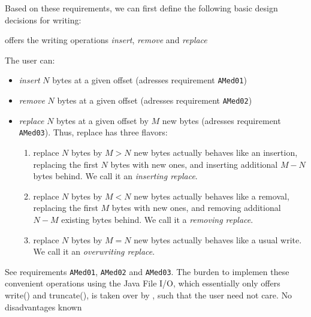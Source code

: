 Based on these requirements, we can first define the following basic design decisions for writing:

{%
\COMPmedia{} offers the writing operations \emph{insert}, \emph{remove} and \emph{replace}
}
{%
The user can:
\begin{itemize}
\item \emph{insert} $N$ bytes at a given offset (adresses requirement \texttt{AMed01})
\item \emph{remove} $N$ bytes at a given offset (adresses requirement \texttt{AMed02})
\item \emph{replace} $N$ bytes at a given offset by $M$ new bytes (adresses requirement \texttt{AMed03}). Thus, replace has three flavors:
\begin{enumerate}
\item replace $N$ bytes by $M>N$ new bytes actually behaves like an insertion, replacing the first $N$ bytes with new ones, and inserting additional $M-N$ bytes behind. We call it an \emph{inserting replace}.
\item replace $N$ bytes by $M<N$ new bytes actually behaves like a removal, replacing the first $M$ bytes with new ones, and removing additional $N-M$ existing bytes behind. We call it a \emph{removing replace}.
\item replace $N$ bytes by $M=N$ new bytes actually behaves like a usual write. We call it an \emph{overwriting replace}.
\end{enumerate}
\end{itemize}
}
{%
See requirements \texttt{AMed01}, \texttt{AMed02} and \texttt{AMed03}. The burden to implemen these convenient operations using the Java File I/O, which essentially only offers write() and truncate(), is taken over by \COMPmedia{}, such that the user need not care.
}
{%
No disadvantages known
}

